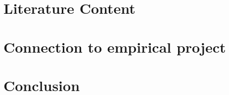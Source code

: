 \documentclass[12pt,draft,a4paper]{article}
\begin{document}
\section{Literature Content} %


\section{Connection to empirical project} %

\section{Conclusion}

% 
\newpage

% 

\end{document}
